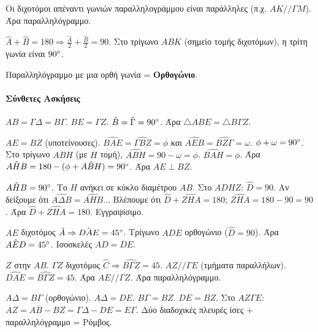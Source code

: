 \documentclass[11pt,a4paper,modern]{FFExercises}
\begin{document}
\begin{alist}
    \item Οι διχοτόμοι απέναντι γωνιών παραλληλογράμμου είναι παράλληλες (π.χ. $AK // \varGamma M$). Άρα παραλληλόγραμμο.
    \item $\hat{A}+\hat{B}=180 \Rightarrow \frac{\hat{A}}{2} + \frac{\hat{B}}{2} = 90$. Στο τρίγωνο $ABK$ (σημείο τομής διχοτόμων), η τρίτη γωνία είναι $90\degree$.
    \item Παραλληλόγραμμο με μια ορθή γωνία = \textbf{Ορθογώνιο}.
\end{alist}

\paragraph{Σύνθετες Ασκήσεις}

\begin{alist}
    \item $AB=\varGamma\Delta = B\varGamma$. $BE=\varGamma Z$. $\hat{B}=\hat{\Gamma}=90\degree$. Άρα $\triangle ABE = \triangle B\varGamma Z$.
    \item $AE=BZ$ (υποτείνουσες). $\hat{BAE} = \hat{\varGamma BZ} = \phi$ και $\hat{AEB} = \hat{BZ\varGamma} = \omega$. $\phi+\omega=90\degree$.
    Στο τρίγωνο $ABH$ (με $H$ τομή), $\hat{ABH} = 90-\omega = \phi$.
    $\hat{BAH} = \phi$. Άρα $\hat{AHB} = 180 - (\phi + \hat{ABH}) = 90\degree$.
    Άρα $AE \perp BZ$.
    \item $\hat{AHB}=90\degree$. Το $H$ ανήκει σε κύκλο διαμέτρου $AB$.
    Στο $ADHZ$: $\hat{D}=90$. Αν δείξουμε ότι $\hat{A\Delta B} = \hat{AHB}$...
    Βλέπουμε ότι $\hat{D} + \hat{ZHA} = 180$;
    $\hat{ZHA} = 180 - 90 = 90$.
    Άρα $\hat{D}+\hat{ZHA} = 180$. Εγγραψίσιμο.
\end{alist}

\begin{alist}
    \item $AE$ διχοτόμος $\hat{A} \Rightarrow \hat{DAE}=45\degree$. Τρίγωνο $ADE$ ορθογώνιο ($\hat{D}=90$). Άρα $\hat{AED}=45\degree$. Ισοσκελές $AD=DE$.
    \item $Z$ στην $AB$. $\varGamma Z$ διχοτόμος $\hat{C} \Rightarrow \hat{B\varGamma Z}=45$. $AZ // \varGamma E$ (τμήματα παραλλήλων).
    $\hat{DAE} = \hat{B\varGamma Z} = 45$. Άρα $AE // \varGamma Z$.
    Άρα παραλληλόγραμμο.
    \item $A\Delta = B\varGamma$ (ορθογώνιο). $A\Delta = DE$. $B\varGamma = BZ$.
    $DE = BZ$.
    Στο $AZ\varGamma E$: $AZ = AB-BZ = \varGamma\Delta - DE = E\varGamma$.
    Δύο διαδοχικές πλευρές ίσες + παραλληλόγραμμο = Ρόμβος.
\end{alist}
\end{document}
